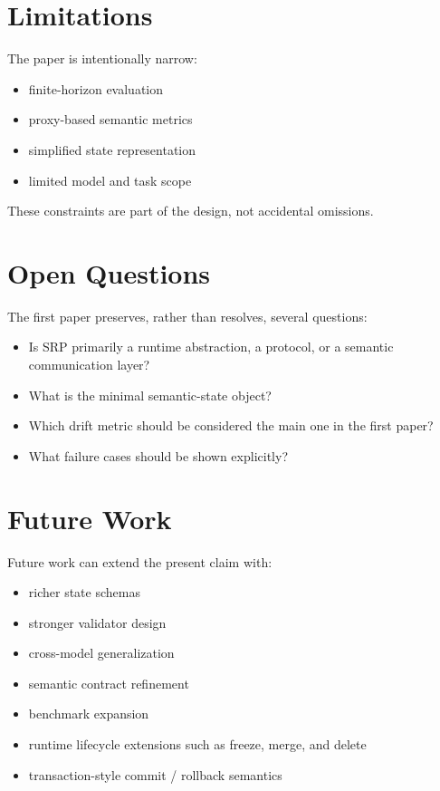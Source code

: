 \documentclass[11pt]{article}
\begin{document}
\section{Limitations}
The paper is intentionally narrow:
\begin{itemize}[leftmargin=*]
  \item finite-horizon evaluation
  \item proxy-based semantic metrics
  \item simplified state representation
  \item limited model and task scope
\end{itemize}

These constraints are part of the design, not accidental omissions.

\section{Open Questions}
The first paper preserves, rather than resolves, several questions:
\begin{itemize}[leftmargin=*]
  \item Is SRP primarily a runtime abstraction, a protocol, or a semantic communication layer?
  \item What is the minimal semantic-state object?
  \item Which drift metric should be considered the main one in the first paper?
  \item What failure cases should be shown explicitly?
\end{itemize}

\section{Future Work}
Future work can extend the present claim with:
\begin{itemize}[leftmargin=*]
  \item richer state schemas
  \item stronger validator design
  \item cross-model generalization
  \item semantic contract refinement
  \item benchmark expansion
  \item runtime lifecycle extensions such as freeze, merge, and delete
  \item transaction-style commit / rollback semantics
\end{itemize}
\end{document}
